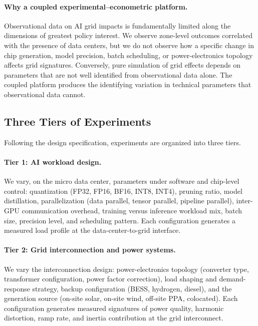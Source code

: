 \documentclass[12pt,letterpaper]{article}
\begin{document}
\paragraph{Why a coupled experimental--econometric platform.}
Observational data on AI grid impacts is fundamentally limited along
the dimensions of greatest policy interest. We observe zone-level outcomes
correlated with the presence of data centers, but we do not observe how a
specific change in chip generation, model precision, batch scheduling, or
power-electronics topology affects grid signatures. Conversely, pure
simulation of grid effects depends on parameters that are not well
identified from observational data alone. The coupled platform produces
the identifying variation in technical parameters that observational
data cannot.

\subsection{Three Tiers of Experiments}

Following the design specification, experiments are organized into three
tiers.

\paragraph{Tier 1: AI workload design.} We vary, on the micro data center,
parameters under software and chip-level control: quantization (FP32,
FP16, BF16, INT8, INT4), pruning ratio, model distillation, parallelization
(data parallel, tensor parallel, pipeline parallel), inter-GPU communication
overhead, training versus inference workload mix, batch size, precision
level, and scheduling pattern. Each configuration generates a measured load
profile at the data-center-to-grid interface.

\paragraph{Tier 2: Grid interconnection and power systems.} We vary the
interconnection design: power-electronics topology (converter type,
transformer configuration, power factor correction), load shaping and
demand-response strategy, backup configuration (BESS, hydrogen, diesel),
and the generation source (on-site solar, on-site wind, off-site PPA,
colocated). Each configuration generates measured signatures of power
quality, harmonic distortion, ramp rate, and inertia contribution at the
grid interconnect.
\end{document}
